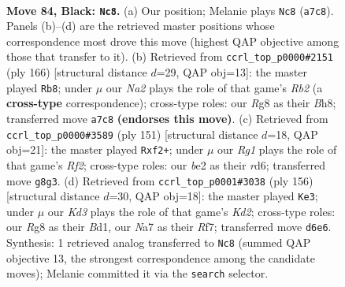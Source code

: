\documentclass[11pt]{article}
\begin{document}
\clearpage

\begin{figure}[p]\centering
\begin{subfigure}{0.46\textwidth}\centering
\resizebox{\linewidth}{!}{%
\newchessgame
\chessboard[
  setfen={6r1/n7/P2k4/8/3K4/2R3PP/2P1B3/8 b - - 2 84},
  showmover=false,
  pgfstyle=straightmove, color=movearrow, markmove={a7-c8}
]}
\caption{}
\end{subfigure}\hfill
\begin{subfigure}{0.46\textwidth}\centering
\resizebox{\linewidth}{!}{%
\newchessgame
\chessboard[
  setfen={7B/5p2/2pk4/2r1p3/8/8/1R2KP2/8 w - - 0 84},
  showmover=false,
  pgfstyle=straightmove, color=movearrow, markmove={b2-b8}
]}
\caption{}
\end{subfigure}
\\[4pt]
\begin{subfigure}{0.46\textwidth}\centering
\resizebox{\linewidth}{!}{%
\newchessgame
\chessboard[
  setfen={8/5r2/1P1R4/6k1/8/PR6/2K2P2/8 b - - 2 76},
  showmover=false,
  pgfstyle=straightmove, color=movearrow, markmove={f7-f2}
]}
\caption{}
\end{subfigure}\hfill
\begin{subfigure}{0.46\textwidth}\centering
\resizebox{\linewidth}{!}{%
\newchessgame
\chessboard[
  setfen={8/5R2/2p5/1pr4p/8/7k/3K4/3B4 w - - 0 79},
  showmover=false,
  pgfstyle=straightmove, color=movearrow, markmove={d2-e3}
]}
\caption{}
\end{subfigure}
\caption{\textbf{Move 84, Black: \texttt{Nc8}.} (a) Our position; Melanie plays \texttt{Nc8} (\texttt{a7c8}). Panels (b)--(d) are the retrieved master positions whose correspondence most drove this move (highest QAP objective among those that transfer to it). (b) Retrieved from \texttt{ccrl\_top\_p0000\#2151} (ply 166) [structural distance $d$=29, QAP obj=13]: the master played \texttt{Rb8}; under $\mu$ our \emph{Na2} plays the role of that game's \emph{Rb2} (a \textbf{cross-type} correspondence); cross-type roles: our \emph{R}g8 as their \emph{B}h8; transferred move \texttt{a7c8} \textbf{(endorses this move)}. (c) Retrieved from \texttt{ccrl\_top\_p0000\#3589} (ply 151) [structural distance $d$=18, QAP obj=21]: the master played \texttt{Rxf2+}; under $\mu$ our \emph{Rg1} plays the role of that game's \emph{Rf2}; cross-type roles: our \emph{b}e2 as their \emph{r}d6; transferred move \texttt{g8g3}. (d) Retrieved from \texttt{ccrl\_top\_p0001\#3038} (ply 156) [structural distance $d$=30, QAP obj=18]: the master played \texttt{Ke3}; under $\mu$ our \emph{Kd3} plays the role of that game's \emph{Kd2}; cross-type roles: our \emph{R}g8 as their \emph{B}d1, our \emph{N}a7 as their \emph{R}f7; transferred move \texttt{d6e6}. Synthesis: 1 retrieved analog transferred to \texttt{Nc8} (summed QAP objective 13, the strongest correspondence among the candidate moves); Melanie committed it via the \texttt{search} selector.}
\label{fig:thought-m167}
\end{figure}
\end{document}
